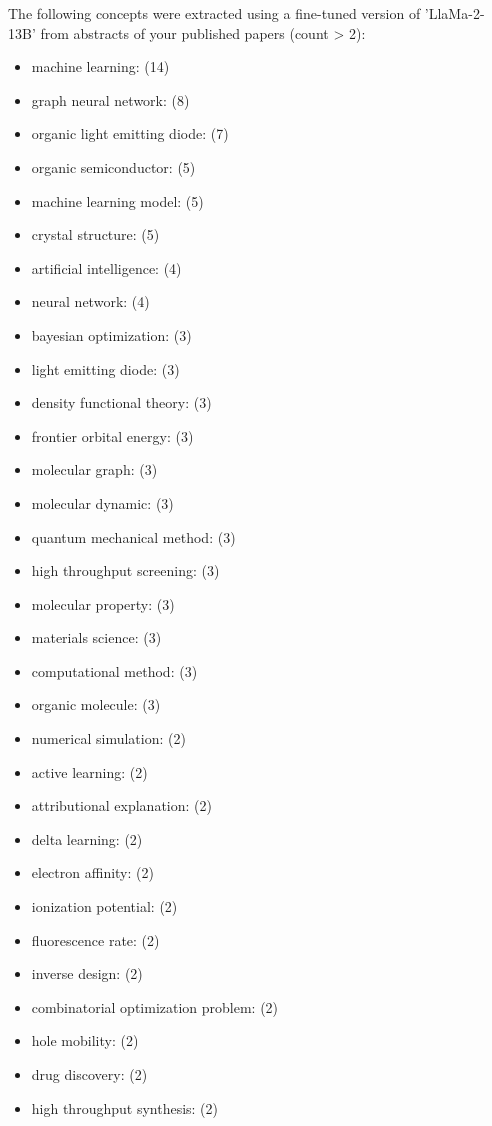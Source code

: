 \documentclass{article}%
\begin{document}
%
The following concepts were extracted using a fine{-}tuned version of 'LlaMa{-}2{-}13B' from abstracts of your published papers (count > 2):\newline%
%
\begin{itemize}%
\item%
machine learning: (14)%
\item%
graph neural network: (8)%
\item%
organic light emitting diode: (7)%
\item%
organic semiconductor: (5)%
\item%
machine learning model: (5)%
\item%
crystal structure: (5)%
\item%
artificial intelligence: (4)%
\item%
neural network: (4)%
\item%
bayesian optimization: (3)%
\item%
light emitting diode: (3)%
\item%
density functional theory: (3)%
\item%
frontier orbital energy: (3)%
\item%
molecular graph: (3)%
\item%
molecular dynamic: (3)%
\item%
quantum mechanical method: (3)%
\item%
high throughput screening: (3)%
\item%
molecular property: (3)%
\item%
materials science: (3)%
\item%
computational method: (3)%
\item%
organic molecule: (3)%
\item%
numerical simulation: (2)%
\item%
active learning: (2)%
\item%
attributional explanation: (2)%
\item%
delta learning: (2)%
\item%
electron affinity: (2)%
\item%
ionization potential: (2)%
\item%
fluorescence rate: (2)%
\item%
inverse design: (2)%
\item%
combinatorial optimization problem: (2)%
\item%
hole mobility: (2)%
\item%
drug discovery: (2)%
\item%
high throughput synthesis: (2)%

\end{itemize}
\end{document}
